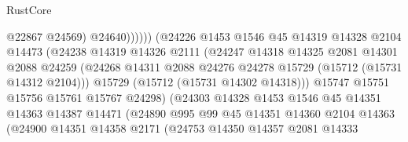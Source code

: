 \begin{lexlean}{RustCore}
\begin{coremodule}
                                          @22867
                                          @24569)
                                        @24640))))))
                            (@24226
                              @1453
                              @1546
                              @45
                              @14319
                              @14328
                              @2104
                              @14473
                              (@24238
                                @14319
                                @14326
                                @2111
                                (@24247
                                  @14318
                                  @14325
                                  @2081
                                  @14301
                                  @2088
                                  @24259
                                  (@24268
                                    @14311
                                    @2088
                                    @24276
                                    @24278
                                    @15729
                                    (@15712 (@15731 @14312 @2104)))
                                  @15729
                                  (@15712 (@15731 @14302 @14318)))
                                @15747
                                @15751
                                @15756
                                @15761
                                @15767
                                @24298)
                              (@24303
                                @14328
                                @1453
                                @1546
                                @45
                                @14351
                                @14363
                                @14387
                                @14471
                                (@24890
                                  @995
                                  @99
                                  @45
                                  @14351
                                  @14360
                                  @2104
                                  @14363
                                  (@24900
                                    @14351
                                    @14358
                                    @2171
                                    (@24753
                                      @14350
                                      @14357
                                      @2081
                                      @14333

\end{coremodule}
\end{lexlean}
